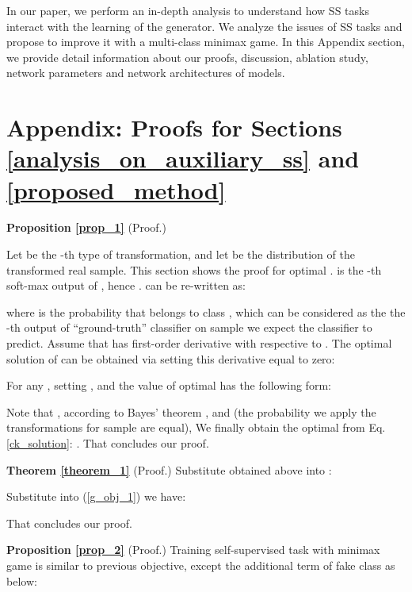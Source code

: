 \documentclass{article}
\begin{document}
  
{\small
 
}



\clearpage
\appendix

In our paper, we perform an in-depth analysis to understand how SS tasks interact with the learning of the generator. We analyze the issues of SS tasks and propose to improve it with a multi-class minimax game. 
In this Appendix section, we provide detail information about our proofs, discussion, ablation study, network parameters and network architectures of models.

\section{Appendix: Proofs for Sections \ref{analysis_on_auxiliary_ss} and \ref{proposed_method}}
\label{appendix_a}

\noindent \textbf{Proposition \ref{prop_1}} (Proof.)

Let  be the -th type of transformation, and let  be the distribution of the transformed real sample.
This section shows the proof for optimal .  is the -th soft-max output of , hence .  can be re-written as: 



where  is the probability that  belongs to class , which can be considered as the the -th output of ``ground-truth'' classifier on sample  we expect the classifier  to predict. Assume that  has first-order derivative with respective to . The optimal solution of  can be obtained via setting this derivative equal to zero:



For any , setting , and the value of optimal  has the following form:



Note that , according to Bayes' theorem , and  (the probability we apply the transformations  for sample  are equal), We finally obtain the optimal  from Eq. \ref{ck_solution}: . That concludes our proof.

\noindent \textbf{Theorem \ref{theorem_1}} (Proof.) Substitute  obtained above into :



Substitute   into (\ref{g_obj_1}) we have: 



That concludes our proof.
 


\noindent \textbf{Proposition \ref{prop_2}} (Proof.) Training self-supervised task  with minimax game is similar to previous objective, except the additional term of fake class as below:
\end{document}
